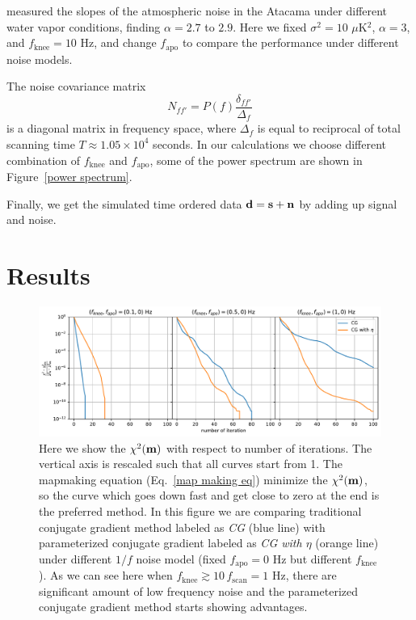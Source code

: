 \documentclass[twocolumn,linenumbers]{aastex631}
\newcommand{\vbm}{\vb{m}}
\begin{document}
\citet{2013ApJ...762...10D} measured the slopes of the atmospheric noise in the Atacama under different water vapor conditions, finding $\alpha = 2.7$ to $2.9$.
Here we fixed $\sigma^2 = 10$ $\mu$K$^2$, $\alpha=3$, and $f_{\text{knee}} = 10$ Hz,
and change $f_{\text{apo}}$ to compare the performance under different noise
models.

The noise covariance matrix 
\begin{equation}
N_{ff'} = P(f) \frac{\delta_{ff'}}{\Delta_f}
\label{noise covariance matrix}
\end{equation}
is a diagonal matrix in frequency space, where $\Delta_f$ is equal to reciprocal
of total scanning time $T \approx 1.05\times 10^{4}$ seconds.
In our calculations we choose different combination of $f_\text{knee}$ and $f_\text{apo}$,
some of the power spectrum are shown in Figure~\ref{power spectrum}.

Finally, we get the simulated time ordered data $\vb{d} = \vb{s} + \vb{n}$ by
adding up signal and noise.



\section{Results} \label{sec:results}

\begin{figure}[]
\centering
\includegraphics[width=\textwidth]{pink_noise_chi2.pdf}
\caption{
    Here we show the $\chi^2(\vbm)$ with respect to number of iterations.
    The vertical axis is rescaled  such that all curves start from 1.
    The mapmaking equation (Eq.~\ref{map making eq}) minimize the $\chi^2(\vbm)$, so
    the curve which goes down fast and get close to zero at the end is the preferred method.
    In this figure we are comparing traditional conjugate gradient method labeled as \textit{CG} (blue line)
    with parameterized conjugate gradient labeled as \textit{CG with $\eta$} (orange line)
    under different $1/f$ noise model (fixed $f_\text{apo}=0$ Hz but different $f_\text{knee}$).
    As we can see here when $f_\text{knee} \gtrsim 10\,f_\text{scan} = 1$ Hz, there are significant amount of
    low frequency noise and the parameterized conjugate gradient method starts showing advantages.
}
\label{1/f noise chi2}
\end{figure}
\end{document}
